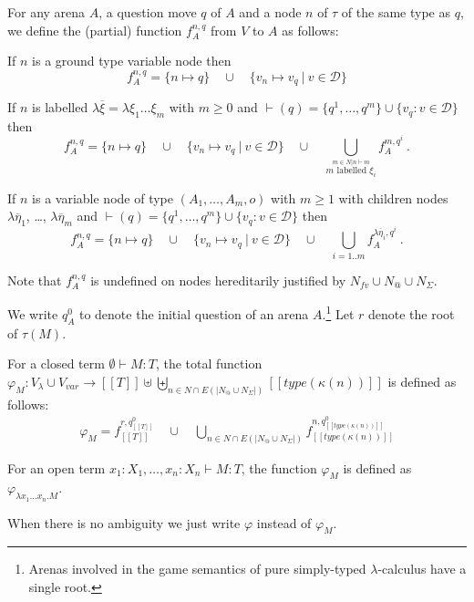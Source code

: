 \documentclass{llncs}
\newcommand\inter{\cap}
\newcommand\union{\cup}
\newcommand\Union{\bigcup}
\newcommand{\relimg}[1]{{(\!| #1 |\!)}}
\newcommand{\sem}[1]{{[\![ #1 ]\!]}}
\begin{document}
\begin{definition}
\label{def:phi_procedure}
For any arena $A$, a question move $q$ of $A$ and a node $n$ of $\tau$ of the same type as $q$,
we define the (partial) function $f_A^{n,q}$ from $V$ to $A$ as follows:

 If $n$ is a ground type variable node then
        $$f_A^{n,q} = \{ n \mapsto q \} \quad \union \quad  \{ v_n \mapsto v_q \ | \ v \in \mathcal{D} \}$$

 If $n$ is labelled $\lambda \overline{\xi} = \lambda \xi_1 \ldots \xi_m$ with $m\geq 0$ and
 $\vdash( q ) = \{ q^1, \ldots, q^m \} \union \{  v_q : v \in \mathcal{D} \} $ then
    $$
    f_A^{n,q} =  \{ n \mapsto q \} \quad  \union \quad  \{ v_n \mapsto v_q \ | \ v \in \mathcal{D} \}
                      \quad \union \quad  \Union_{\stackrel{ m \in N | n \vdash m}{ m \mbox{ labelled } \xi_i}} f_A^{m, q^i} \ .
    $$

 If $n$ is a variable node of type $(A_1,\ldots,A_m,o)$ with $m\geq1$
with children nodes $\lambda \overline{\eta}_1$, \ldots, $\lambda \overline{\eta}_m$ and
$\vdash( q ) = \{ q^1, \ldots, q^m \} \union \{  v_q : v \in \mathcal{D} \} $ then
    $$f_A^{n,q} = \{ n \mapsto q \} \quad \union\quad \{ v_n \mapsto v_q \ | \ v \in \mathcal{D}   \} \quad\union\quad     \Union_{i=1..m} f_A^{\lambda \overline{\eta}_i, q^i} \ .
    $$

Note that $f_A^{n,q}$ is undefined on nodes hereditarily justified by $N_{fv} \union N_@ \union N_\Sigma$.
\end{definition}


\begin{definition}
We write $q^0_A$ to denote the initial question of an arena $A$.\footnote{Arenas involved in the game semantics of pure simply-typed $\lambda$-calculus have a single root.}
Let $r$ denote the root of $\tau(M)$.

For a closed term $\emptyset \vdash M : T$, the total function $\varphi_M : V_\lambda \union V_{var} \longrightarrow  \sem{T} \uplus \biguplus_{n \in N \inter E \relimg{N_@ \union N_\Sigma} } \sem{type(\kappa(n))}$ is defined as follows:
\begin{align*}
\varphi_M = f_{\sem{T}}^{r, q^0_{\sem{T}}}
\quad \union \quad
        \Union_{n \in N \inter E \relimg{N_@ \union N_\Sigma}}  f_{\sem{type(\kappa(n))}}^{n, q^0_{\sem{type(\kappa(n))}}}
\end{align*}

For an open term $x_1 : X_1, \ldots, x_n : X_n \vdash M : T$, the function $\varphi_M$ is defined as
$\varphi_{\lambda x_1 \ldots x_n . M}$.

When there is no ambiguity we just write $\varphi$ instead of $\varphi_M$.
\end{definition}
\end{document}
